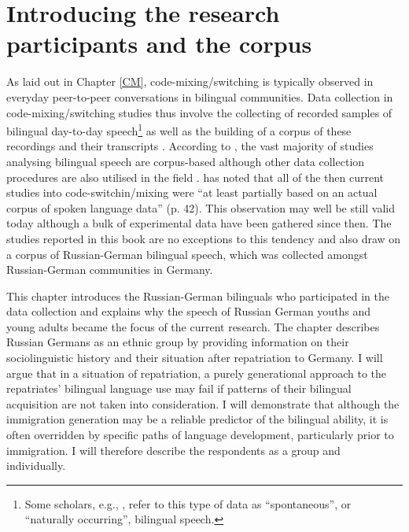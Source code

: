 \chapter{Introducing the research participants and the corpus}\label{RuDe}

As laid out in Chapter \ref{CM}, code-mixing/switching is typically observed in everyday peer-to-peer conversations in bilingual communities. Data collection in code-mixing/switching studies thus involve the collecting of recorded samples of bilingual day-to-day speech\footnote{Some scholars, e.g., \citet{torres-travis}, refer to this type of data as “spontaneous”, or “naturally occurring”, bilingual speech.} as well as the building of a corpus of these recordings and their transcripts \citep[cf.][]{adamou-16}. According to \citet[][42]{backus-two-1996}, the vast majority of studies analysing bilingual speech are corpus-based although other data collection procedures are also utilised in the field \citep[see e.g.,][]{kootstra-etal12,bullock-toribio-gullberg-etal}. \citet[][]{backus-two-1996} has noted that all of the then current studies into code-switchin/mixing were ``at least partially based on an actual corpus of spoken language data'' (p. 42). This observation may well be still valid today although a bulk of experimental data have been gathered since then. The studies reported in this book are no exceptions to this tendency and also draw on a corpus of Russian-German bilingual speech, which was collected amongst Russian-German communities in Germany.  

This chapter introduces the Russian-German bilinguals who participated in the data collection and explains why the speech of Russian German youths and young adults became the focus of the current research. The chapter describes Russian Germans as an ethnic group by providing information on their sociolinguistic history and their situation after repatriation to Germany. I will argue that in a situation of repatriation, a purely generational approach to the repatriates' bilingual language use may fail if patterns of their bilingual acquisition are not taken into consideration. I will demonstrate that although the immigration generation may be a reliable predictor of the bilingual ability, it is often overridden by specific paths of language development, particularly prior to immigration. I will therefore describe the respondents as a group and individually. 

